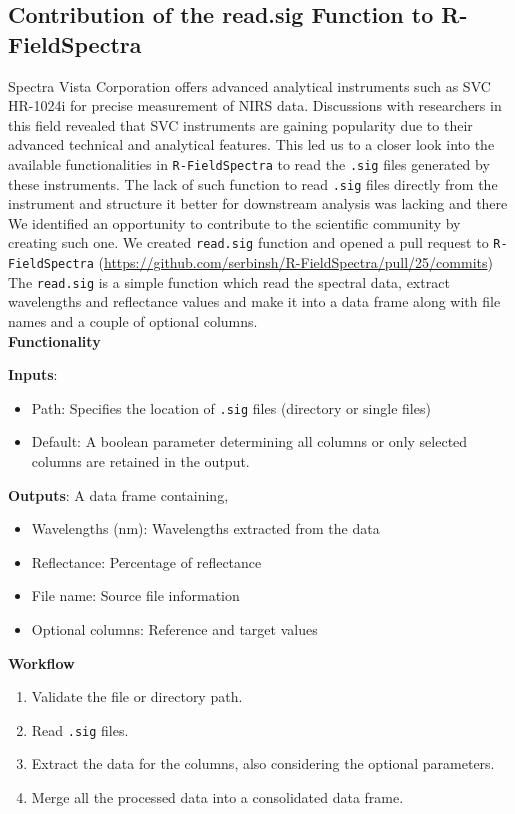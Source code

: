 \documentclass[12pt,a4paper]{report}
\begin{document}
\subsection{Contribution of the read.sig Function to R-FieldSpectra}
Spectra Vista Corporation offers advanced analytical instruments such as SVC HR-1024i for precise measurement of NIRS data. Discussions with researchers in this field revealed that SVC instruments are gaining popularity due to their advanced technical and analytical features. This led us to a closer look into the available functionalities in \texttt{R-FieldSpectra} to read the \texttt{.sig} files generated by these instruments. The lack of such function to read \texttt{.sig} files directly from the instrument and structure it better for downstream analysis was lacking and there We identified an opportunity to contribute to the scientific community by creating such one. We created \texttt{read.sig} function and opened a pull request to \texttt{R-FieldSpectra} (\url{https://github.com/serbinsh/R-FieldSpectra/pull/25/commits}) The \texttt{read.sig} is a simple function which read the spectral data, extract wavelengths and reflectance values and make it into a data frame along with file names and a couple of optional columns.\\

\textbf{Functionality}

\textbf{Inputs}:
\begin{itemize}
    \item Path: Specifies the location of \texttt{.sig} files (directory or single files)
    \item Default: A boolean parameter determining all columns or only selected columns are retained in the output.
\end{itemize}

\textbf{Outputs}: A data frame containing,
\begin{itemize}
    \item Wavelengths (nm): Wavelengths extracted from the data
    \item Reflectance: Percentage of reflectance
    \item File name: Source file information
    \item Optional columns: Reference and target values
\end{itemize}

\textbf{Workflow}
\begin{enumerate}
    \item Validate the file or directory path.
    \item Read \texttt{.sig} files.
    \item Extract the data for the columns, also considering the optional parameters.
    \item Merge all the processed data into a consolidated data frame.
\end{enumerate}
\end{document}
